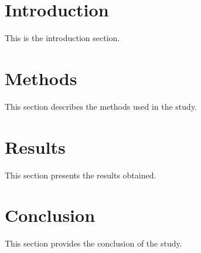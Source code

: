 \tableofcontents

\section{Introduction}
This is the introduction section.

\section{Methods}
This section describes the methods used in the study.

\section{Results}
This section presents the results obtained.

\section{Conclusion}
This section provides the conclusion of the study.